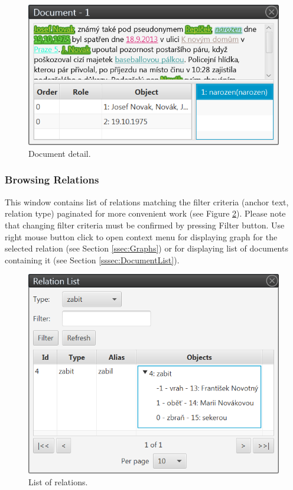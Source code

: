 \begin{figure}[!htb]
        \centering
        \includegraphics[width=\textwidth]{Images/documentview}
        \caption{Document detail.}
        \label{fig:DocumentView}
\end{figure}

\subsubsection{Browsing Relations}

This window contains list of relations matching the filter criteria (anchor
text, relation type) paginated for more convenient work (see Figure
\ref{fig:RelationList}). Please note that changing filter criteria must be
confirmed by pressing Filter button. Use right mouse button click to open
context menu for displaying graph for the selected relation (see Section
\ref{ssec:Graphs}) or for displaying list of documents containing it (see
Section \ref{sssec:DocumentList}).

\begin{figure}[!htb]
        \centering
        \includegraphics[width=\textwidth]{Images/relationlist}
        \caption{List of relations.}
        \label{fig:RelationList}
\end{figure}

